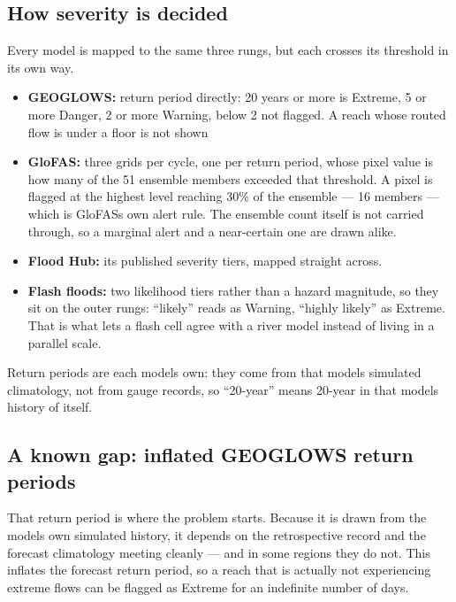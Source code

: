 \subsection{How severity is decided}\label{how-severity-is-decided}

Every model is mapped to the same three rungs, but each crosses its threshold in its own way.

\begin{itemize}
\item
  \textbf{GEOGLOWS:} return period directly: 20 years or more is Extreme, 5 or more Danger, 2 or more Warning, below 2 not flagged. A reach whose routed flow is under a floor is not shown
\item
  \textbf{GloFAS:} three grids per cycle, one per return period, whose pixel value is how many of the 51 ensemble members exceeded that threshold. A pixel is flagged at the highest level reaching 30\% of the ensemble --- 16 members --- which is GloFAS\textquotesingle s own alert rule. The ensemble count itself is not carried through, so a marginal alert and a near-certain one are drawn alike.
\item
  \textbf{Flood Hub:} its published severity tiers, mapped straight across.
\item
  \textbf{Flash floods:} two likelihood tiers rather than a hazard magnitude, so they sit on the outer rungs: ``likely'' reads as Warning, ``highly likely'' as Extreme. That is what lets a flash cell agree with a river model instead of living in a parallel scale.
\end{itemize}

Return periods are each model\textquotesingle s own: they come from that model\textquotesingle s simulated climatology, not from gauge records, so ``20-year'' means 20-year in that model\textquotesingle s history of itself.

\subsection{A known gap: inflated GEOGLOWS return periods}\label{withheld-geoglows}


That return period is where the problem starts.
Because it is drawn from the model\textquotesingle s own simulated history, it depends on the retrospective record and the forecast climatology meeting cleanly --- and in some regions they do not.
This inflates the forecast return period, so a reach that is actually not experiencing extreme flows can be flagged as Extreme for an indefinite number of days.


